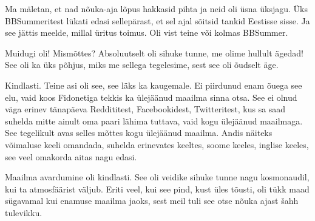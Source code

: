 Ma mäletan, et nad nõuka-aja lõpus hakkasid pihta ja neid oli üsna üksjagu. Üks 
BBSummeritest lükati edasi sellepärast, et sel ajal sõitsid tankid Eestisse 
sisse. Ja see jättis meelde, millal üritus toimus. Oli vist teine või kolmas 
BBSummer.
                 

Muidugi oli! Mismõttes? Absoluutselt oli sihuke tunne, me olime hullult ägedad! 
See oli ka üks põhjus, miks me sellega tegelesime, sest see oli õudselt äge.


Kindlasti. Teine asi oli see, see läks ka kaugemale. Ei piirdunud enam õuega 
see elu, vaid koos Fidonetiga tekkis ka ülejäänud maailma sinna otsa. See ei 
olnud väga erinev tänapäeva Reddititest, Facebookidest, Twitteritest, kus sa 
saad suhelda mitte ainult oma paari lähima tuttava, vaid kogu ülejäänud 
maailmaga. See tegelikult avas selles mõttes kogu ülejäänud maailma. Andis 
näiteks võimaluse keeli omandada,  suhelda  erinevates keeltes, soome keeles, 
inglise keeles, see veel omakorda aitas nagu edasi.
                 

Maailma avardumine oli kindlasti. See oli veidike sihuke tunne nagu 
kosmonaudil, kui ta  atmosfäärist väljub. Eriti veel, kui see pind, kust üles 
tõusti, oli tükk maad sügavamal kui enamuse maailma jaoks, sest meil tuli see 
otse nõuka ajast šahh tulevikku.


